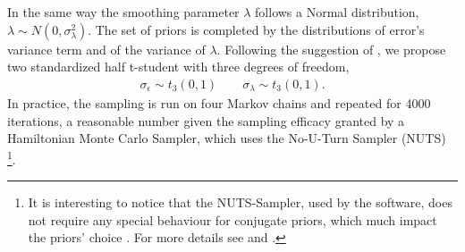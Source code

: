 \documentclass{article}\usepackage[]{graphicx}\usepackage[]{color}
\begin{document}
In the same way the smoothing parameter $\lambda$ follows a Normal distribution, $\lambda \sim N(0, \sigma_{\lambda}^2)$.
The set of priors is completed by the distributions of error's variance term and of the variance of $ \lambda $. Following the suggestion of , we propose two standardized half t-student with three degrees of freedom, 
\begin{align}\label{variance1}
\sigma_{\epsilon} \sim t_{3}(0,1) \quad \quad \sigma_{\lambda} \sim t_{3}(0,1).
\end{align}
In practice, the sampling is run on four Markov chains and repeated for 4000 iterations, a reasonable number given the sampling efficacy granted by a Hamiltonian Monte Carlo Sampler, which uses the No-U-Turn Sampler (NUTS) \footnote{It is interesting to notice that the NUTS-Sampler, used by the software, does not require any special behaviour for conjugate priors, which much impact the priors' choice . For more details see  and .}.
\end{document}
